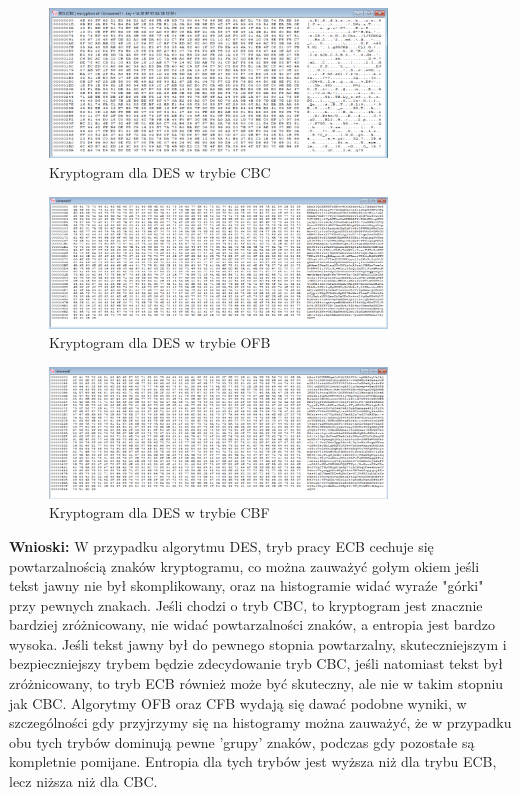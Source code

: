 \documentclass{article}
\begin{document}
\begin{figure}[H]
    \centering
    \includegraphics[width=0.8\textwidth]{car_des_cbc.png}
    \caption{Kryptogram dla DES w trybie CBC}
\end{figure}

\begin{figure}[H]
    \centering
    \includegraphics[width=0.8\textwidth]{cat_des_ofb.png}
    \caption{Kryptogram dla DES w trybie OFB}
\end{figure}


\begin{figure}[H]
    \centering
    \includegraphics[width=0.8\textwidth]{cat_des_cbf.png}
    \caption{Kryptogram dla DES w trybie CBF}
\end{figure}




\textbf{Wnioski: } W przypadku algorytmu DES, tryb pracy ECB cechuje się powtarzalnością znaków kryptogramu, co można zauważyć gołym okiem jeśli tekst jawny nie był skomplikowany, oraz na histogramie widać wyraźe "górki" przy pewnych znakach.
Jeśli chodzi o tryb CBC, to kryptogram jest znacznie bardziej zróżnicowany, nie widać powtarzalności znaków, a entropia jest bardzo wysoka. Jeśli tekst jawny był do pewnego stopnia powtarzalny, skuteczniejszym i bezpieczniejszy trybem będzie
zdecydowanie tryb CBC, jeśli natomiast tekst był zróżnicowany, to tryb ECB również może być skuteczny, ale nie w takim stopniu jak CBC. Algorytmy OFB oraz CFB wydają się dawać podobne wyniki, w szczególności gdy przyjrzymy się na histogramy można zauważyć,
że w przypadku obu tych trybów dominują pewne 'grupy' znaków, podczas gdy pozostałe są kompletnie pomijane. Entropia dla tych trybów jest wyższa niż dla trybu ECB, lecz niższa niż dla CBC.
\end{document}
